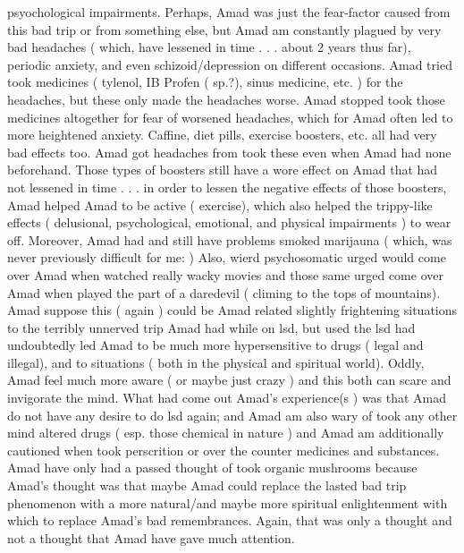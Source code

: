 \documentclass[12pt]{book}
\begin{document}
psyochological impairments. Perhaps, Amad was just the fear-factor caused from this bad trip or from something else, but Amad am constantly plagued by very bad headaches ( which, have lessened in time . . .  about 2 years thus far), periodic anxiety, and even schizoid/depression on different occasions. Amad tried took medicines ( tylenol, IB Profen ( sp.?), sinus medicine, etc. ) for the headaches, but these only made the headaches worse. Amad stopped took those medicines altogether for fear of worsened headaches, which for Amad often led to more heightened anxiety. Caffine, diet pills, exercise boosters, etc. all had very bad effects too. Amad got headaches from took these even when Amad had none beforehand. Those types of boosters still have a wore effect on Amad that had not lessened in time . . .  in order to lessen the negative effects of those boosters, Amad helped Amad to be active ( exercise), which also helped the trippy-like effects ( delusional, psychological, emotional, and physical impairments ) to wear off. Moreover, Amad had and still have problems smoked marijauna ( which, was never previously difficult for me: ) Also, wierd psychosomatic urged would come over Amad when watched really wacky movies and those same urged come over Amad when played the part of a daredevil ( climing to the tops of mountains). Amad suppose this ( again ) could be Amad related slightly frightening situations to the terribly unnerved trip Amad had while on lsd, but used the lsd had undoubtedly led Amad to be much more hypersensitive to drugs ( legal and illegal), and to situations ( both in the physical and spiritual world). Oddly, Amad feel much more aware ( or maybe just crazy ) and this both can scare and invigorate the mind. What had come out Amad's experience(s ) was that Amad do not have any desire to do lsd again; and Amad am also wary of took any other mind altered drugs ( esp. those chemical in nature ) and Amad am additionally cautioned when took perscrition or over the counter medicines and substances. Amad have only had a passed thought of took organic mushrooms because Amad's thought was that maybe Amad could replace the lasted bad trip phenomenon with a more natural/and maybe more spiritual enlightenment with which to replace Amad's bad remembrances. Again, that was only a thought and not a thought that Amad have gave much attention.
\end{document}
